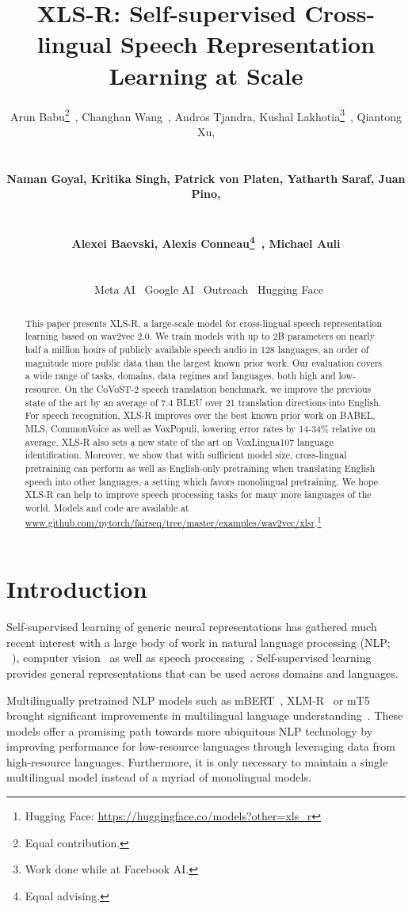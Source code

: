 \documentclass{article} \usepackage{iclr2022_conference,times}
\title{XLS-R: Self-supervised Cross-lingual Speech Representation Learning at Scale}
\author{\centerline{
Arun Babu\thanks{Equal contribution.}~, 
Changhan Wang\samethanks~,
Andros Tjandra, 
Kushal Lakhotia\thanks{Work done while at Facebook AI.}~, 
Qiantong Xu,} \vspace{1mm}\\
\centerline{\textbf{
Naman Goyal,
Kritika Singh, 
Patrick von Platen, 
Yatharth Saraf,
Juan Pino,}}\vspace{1mm}\\
\centerline{\textbf{
Alexei Baevski, 
Alexis Conneau\thanks{Equal advising.}~,
Michael Auli\samethanks}}\vspace{1mm}\\
\centerline{\normalfont ~Meta AI\hspace{0.2in}
~Google AI\hspace{0.2in}
~Outreach\hspace{0.2in}
~Hugging Face}
}
\newcommand{\xlsrp}{XLS-R}
\begin{document}
\maketitle

\begin{abstract}
This paper presents \xlsrp{}, a large-scale model for cross-lingual speech representation learning based on wav2vec 2.0. 
We train models with up to 2B parameters on nearly half a million hours of publicly available speech audio in 128 languages, an order of magnitude more public data than the largest known prior work.
Our evaluation covers a wide range of tasks, domains, data regimes and languages, both high and low-resource. 
On the CoVoST-2 speech translation benchmark, we improve the previous state of the art by an average of 7.4 BLEU over 21 translation directions into English.
For speech recognition, \xlsrp{} improves over the best known prior work on BABEL, MLS, CommonVoice as well as VoxPopuli, lowering error rates by 14-34\% relative on average.
\xlsrp{} also sets a new state of the art on VoxLingua107 language identification.
Moreover, we show that with sufficient model size, cross-lingual pretraining can perform as well as English-only pretraining when translating English speech into other languages, a setting which favors monolingual pretraining.
We hope \xlsrp{} can help to improve speech processing tasks for many more languages of the world. 
Models and code are available at {\small\url{www.github.com/pytorch/fairseq/tree/master/examples/wav2vec/xlsr}}.\footnote{Hugging Face: {\small \url{https://huggingface.co/models?other=xls_r}}}
\end{abstract}


\section{Introduction}
Self-supervised learning of generic neural representations has gathered much recent interest with a large body of work in natural language processing (NLP; ~\citealt{radford2018improving,baevski2019cloze,devlin2018bert,raffel2019exploring}), computer vision~\citep{chen2020simple,he2020momentum,caron2021emerging} as well as speech processing~\citep{oord2018cpc,schneider2019wav2vec,baevski2020wav,hsu2020hubert,chung2021w2vbert}. 
Self-supervised learning provides general representations that can be used across domains and languages. 

Multilingually pretrained NLP models such as mBERT~\citep{devlin2018bert}, XLM-R~\citep{conneau-etal-2020-unsupervised} or mT5~\citep{xue2020mt5} brought significant improvements in multilingual language understanding~\citep{conneau2018xnli,hu2020xtreme,ruder2021xtreme}.
These models offer a promising path towards more ubiquitous NLP technology by improving performance for low-resource languages through leveraging data from high-resource languages.
Furthermore, it is only necessary to maintain a single multilingual model instead of a myriad of monolingual models.
\end{document}
